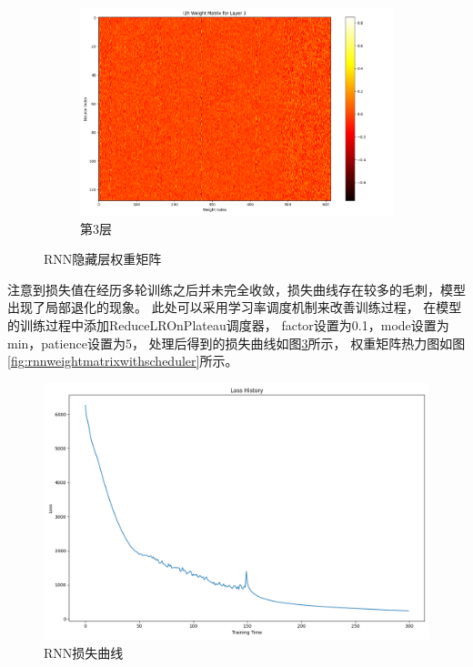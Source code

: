 \begin{figure}[H]
\begin{subfigure}{0.3\textwidth}
            \includegraphics[width=\linewidth]{../output/rnn/no scheduler/Weight Matrix for Layer 3.png}
            \caption{第3层}
            \label{fig:rnnweightmatrixforlayer3}
        \end{subfigure}
        \caption{RNN隐藏层权重矩阵}
        \label{fig:rnnweightmatrix}
    \end{figure}

    注意到损失值在经历多轮训练之后并未完全收敛，损失曲线存在较多的毛刺，模型出现了局部退化的现象。
    此处可以采用学习率调度机制来改善训练过程，
    在模型的训练过程中添加ReduceLROnPlateau调度器，
    factor设置为0.1，mode设置为min，patience设置为5，
    处理后得到的损失曲线如图\ref{fig:RNNlosshistorywithscheduler}所示，
    权重矩阵热力图如图\ref{fig:rnnweightmatrixwithscheduler}所示。

    \begin{figure}[H]
        \centering
        \includegraphics[width=\linewidth]{../output/rnn/with scheduler/rnnloss.png}
        \caption{RNN损失曲线}
        \label{fig:RNNlosshistorywithscheduler}
    \end{figure}


